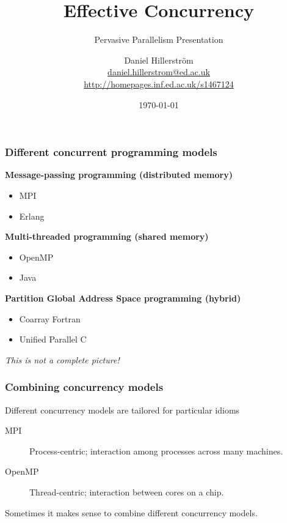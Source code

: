 \documentclass[10pt,compress]{beamer}
\author[Daniel Hillerström]{Daniel Hillerström\\\footnotesize{\href{mailto:daniel.hillerstrom@ed.ac.uk}{daniel.hillerstrom@ed.ac.uk}}\\\footnotesize{\href{http://homepages.inf.ed.ac.uk/s1467124}{http://homepages.inf.ed.ac.uk/s1467124}}}
\institute[University of Edinburgh]{CDT Pervasive Parallelism, University of Edinburgh}
\date{\today}
\title{Effective Concurrency} %
\subtitle{Pervasive Parallelism Presentation}
\begin{document}
  \maketitle

  \begin{frame}
    \frametitle{Different concurrent programming models}
    \textbf{Message-passing programming (distributed memory)}
    \begin{itemize}
      \item MPI
      \item Erlang
    \end{itemize}
    \textbf{Multi-threaded programming (shared memory)}
    \begin{itemize}
      \item OpenMP
      \item Java
    \end{itemize}
    \textbf{Partition Global Address Space programming (hybrid)}
    \begin{itemize}
      \item Coarray Fortran
      \item Unified Parallel C
    \end{itemize}
    \emph{\tiny{This is not a complete picture!}}
  \end{frame}

  \begin{frame}
    \frametitle{Combining concurrency models}
    Different concurrency models are tailored for particular idioms
    \begin{description}
      \item[\alert<1->{MPI}] Process-centric; interaction among processes across many machines.
      \item[\alert<1->{OpenMP}] Thread-centric; interaction between cores on a chip.
    \end{description}
    Sometimes it makes sense to combine different concurrency models.
  \end{frame}
\end{document}
